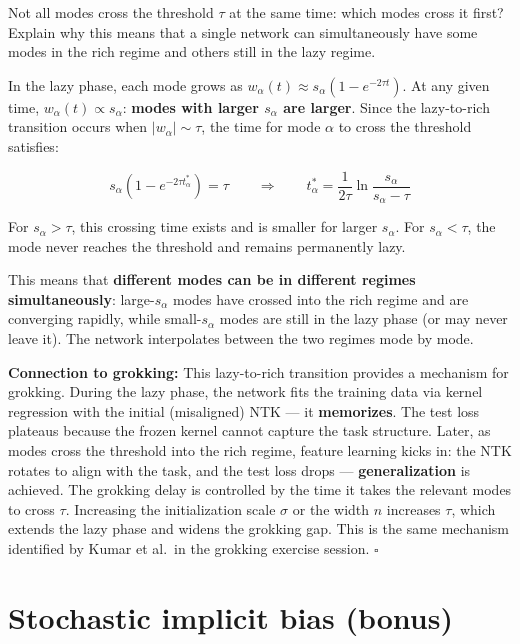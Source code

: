 \documentclass[11pt]{article}
\begin{document}
\begin{exercise}
\label{ex:td-5c}
Not all modes cross the
threshold \(\tau\) at the same time: which modes cross it first? Explain
why this means that a single network can simultaneously have some modes
in the rich regime and others still in the lazy regime.
\end{exercise}

\begin{solution}[ex:td-5c]
In the lazy phase, each mode grows as
\(w_\alpha(t) \approx s_\alpha(1 - e^{-2\tau t})\). At any given time,
\(w_\alpha(t) \propto s_\alpha\): \textbf{modes with larger \(s_\alpha\)
are larger}. Since the lazy-to-rich transition occurs when
\(|w_\alpha| \sim \tau\), the time for mode \(\alpha\) to cross the
threshold satisfies:

\[s_\alpha(1 - e^{-2\tau t_\alpha^*}) = \tau \qquad \Longrightarrow \qquad t_\alpha^* = \frac{1}{2\tau}\ln\frac{s_\alpha}{s_\alpha - \tau}\]

For \(s_\alpha > \tau\), this crossing time exists and is smaller for
larger \(s_\alpha\). For \(s_\alpha < \tau\), the mode never reaches the
threshold and remains permanently lazy.

This means that \textbf{different modes can be in different regimes
simultaneously}: large-\(s_\alpha\) modes have crossed into the rich
regime and are converging rapidly, while small-\(s_\alpha\) modes are
still in the lazy phase (or may never leave it). The network
interpolates between the two regimes mode by mode.

\textbf{Connection to grokking:} This lazy-to-rich transition provides a
mechanism for grokking. During the lazy phase, the network fits the
training data via kernel regression with the initial (misaligned) NTK
--- it \textbf{memorizes}. The test loss plateaus because the frozen
kernel cannot capture the task structure. Later, as modes cross the
threshold into the rich regime, feature learning kicks in: the NTK
rotates to align with the task, and the test loss drops ---
\textbf{generalization} is achieved. The grokking delay is controlled by
the time it takes the relevant modes to cross \(\tau\). Increasing the
initialization scale \(\sigma\) or the width \(n\) increases \(\tau\),
which extends the lazy phase and widens the grokking gap. This is the
same mechanism identified by Kumar et al.~in the grokking exercise
session. \(\square\)
\end{solution}

\section{Stochastic implicit bias (bonus)}
\label{sec:td-stochastic}
\end{document}
